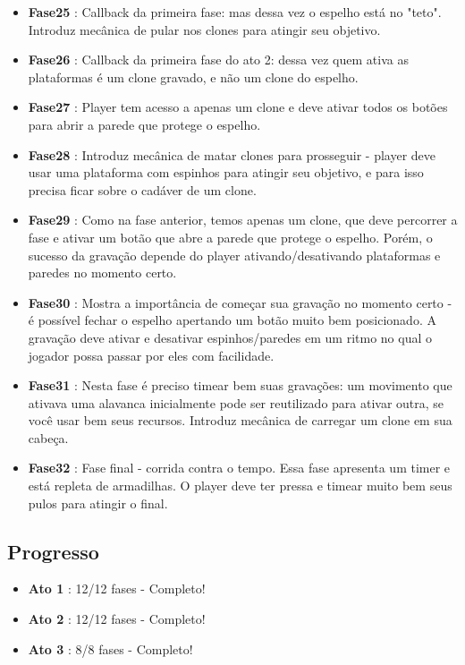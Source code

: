 \documentclass[a4paper, 11pt]{article}
\begin{document}
\begin{itemize}
	\begin{itemize} 
		\item \textbf{Fase25} : Callback da primeira fase: mas dessa vez o espelho está no "teto". Introduz mecânica de pular nos clones para atingir seu objetivo.
		\item \textbf{Fase26} : Callback da primeira fase do ato 2: dessa vez quem ativa as plataformas é um clone gravado, e não um clone do espelho.
		\item \textbf{Fase27} : Player tem acesso a apenas um clone e deve ativar todos os botões para abrir a parede que protege o espelho.
		\item \textbf{Fase28} : Introduz mecânica de matar clones para prosseguir - player deve usar uma plataforma com espinhos para atingir seu objetivo, e para isso precisa ficar sobre o cadáver de um clone.
		\item \textbf{Fase29} : Como na fase anterior, temos apenas um clone, que deve percorrer a fase e ativar um botão que abre a parede que protege o espelho. Porém, o sucesso da gravação depende do player ativando/desativando plataformas e paredes no momento certo.
		\item \textbf{Fase30} : Mostra a importância de começar sua gravação no momento certo - é possível fechar o espelho apertando um botão muito bem posicionado. A gravação deve ativar e desativar espinhos/paredes em um ritmo no qual o jogador possa passar por eles com facilidade.
		\item \textbf{Fase31} : Nesta fase é preciso timear bem suas gravações: um movimento que ativava uma alavanca inicialmente pode ser reutilizado para ativar outra, se você usar bem seus recursos. Introduz mecânica de carregar um clone em sua cabeça.
		\item \textbf{Fase32} : Fase final - corrida contra o tempo. Essa fase apresenta um timer e está repleta de armadilhas. O player deve ter pressa e timear muito bem seus pulos para atingir o final.
	\end{itemize} 

\subsection{Progresso}
	\begin{itemize}
		\item \textbf{Ato 1} : 12/12 fases - Completo!
		\item \textbf{Ato 2} : 12/12 fases - Completo!
		\item \textbf{Ato 3} : 8/8 fases - Completo!
 

\end{itemize}
\end{itemize}
\end{document}

